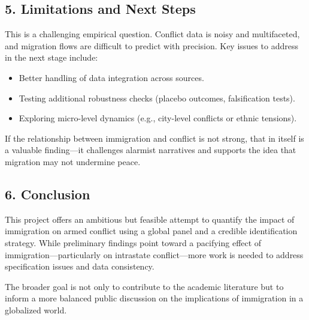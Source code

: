 \documentclass[
  letterpaper,
  DIV=11,
  numbers=noendperiod]{scrartcl}
\begin{document}
\subsection{5. Limitations and Next
Steps}\label{limitations-and-next-steps}

This is a challenging empirical question. Conflict data is noisy and
multifaceted, and migration flows are difficult to predict with
precision. Key issues to address in the next stage include:

\begin{itemize}
\item
  Better handling of data integration across sources.
\item
  Testing additional robustness checks (placebo outcomes, falsification
  tests).
\item
  Exploring micro-level dynamics (e.g., city-level conflicts or ethnic
  tensions).
\end{itemize}

If the relationship between immigration and conflict is not strong, that
in itself is a valuable finding---it challenges alarmist narratives and
supports the idea that migration may not undermine peace.

\subsection{6. Conclusion}\label{conclusion}

This project offers an ambitious but feasible attempt to quantify the
impact of immigration on armed conflict using a global panel and a
credible identification strategy. While preliminary findings point
toward a pacifying effect of immigration---particularly on intrastate
conflict---more work is needed to address specification issues and data
consistency.

The broader goal is not only to contribute to the academic literature
but to inform a more balanced public discussion on the implications of
immigration in a globalized world.
\end{document}
